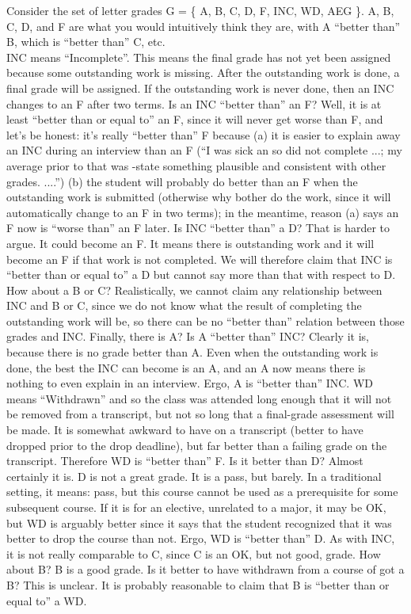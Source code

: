 \documentclass[12pt]{article}
\newenvironment{problem}[2][Problem]{\begin{trivlist}
\item[\hskip \labelsep {\bfseries #1}\hskip \labelsep {\bfseries #2.}]}{\end{trivlist}}
\begin{document}
\begin{problem}{7}
Consider the set of letter grades G = \{ A, B, C, D, F, INC, WD, AEG \}. A, B, C, D, and F are what you would intuitively think they are, with A “better than” B, which is “better than” C, etc. \\ \vskip 0.05in
INC means “Incomplete”. This means the final grade has not yet been assigned because some outstanding work is missing. After the outstanding work is done, a final grade will be assigned. If the outstanding work is never done, then an INC changes to an F after two terms. Is an INC “better than” an F? Well, it is at least “better than or equal to” an F, since it will never get worse than F, and let’s be honest: it’s really “better than” F because (a) it is easier to explain away an INC during an interview than an F (“I was sick an so did not complete ...; my average prior to that was -state something plausible and consistent with other grades. ....”) (b) the student will probably do better than an F when the outstanding work is submitted (otherwise why bother do the work, since it will automatically change to an F in two terms); in the meantime, reason (a) says an F now is “worse than” an F later. Is INC “better than” a D? That is harder to argue. It could become an F. It means there is outstanding work and it will become an F if that work is not completed. We will therefore claim that INC is “better than or equal to” a D but cannot say more than that with respect to D. How about a B or C? Realistically, we cannot claim any relationship between INC and B or C, since we do not know what the result of completing the outstanding work will be, so there can be no “better than” relation between those grades and INC. Finally, there is A? Is A “better than” INC? Clearly it is, because there is no grade better than A. Even when the outstanding work is done, the best the INC can become is an A, and an A now means there is nothing to even explain in an interview. Ergo, A is “better than” INC. \vskip 0.2in
WD means “Withdrawn” and so the class was attended long enough that it will not be removed from a transcript, but not so long that a final-grade assessment will be made. It is somewhat awkward to have on a transcript (better to have dropped prior to the drop deadline), but far better than a failing grade on the transcript. Therefore WD is “better than” F. Is it better than D? Almost certainly it is. D is not a great grade. It is a pass, but barely. In a traditional setting, it means: pass, but this course cannot be used as a prerequisite for some subsequent course. If it is for an elective, unrelated to a major, it may be OK, but WD is arguably better since it says that the student recognized that it was better to drop the course than not. Ergo, WD is “better than” D. As with INC, it is not really comparable to C, since C is an OK, but not good, grade. How about B? B is a good grade. Is it better to have withdrawn from a course of got a B? This is unclear. It is probably reasonable to claim that B is “better than or equal to” a WD. \vskip 0.2in

\end{problem}
\end{document}
